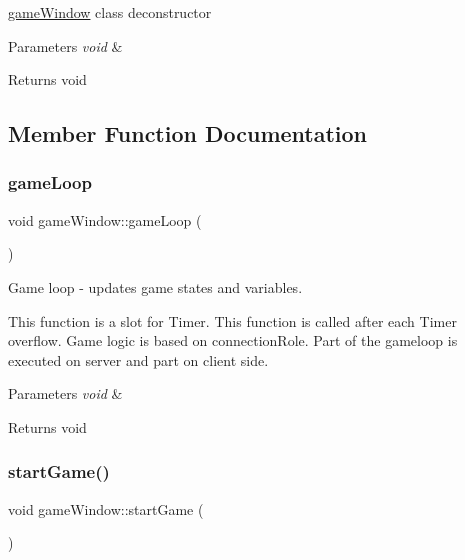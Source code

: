 \mbox{\hyperlink{classgame_window}{game\+Window}} class deconstructor 


\begin{DoxyParams}{Parameters}
{\em void} & \\
\hline
\end{DoxyParams}
\begin{DoxyReturn}{Returns}
void 
\end{DoxyReturn}


\subsection{Member Function Documentation}
\mbox{\label{classgame_window_a2aeb402950ac1faa754288a9e7464563}} 
\subsubsection{\texorpdfstring{game\+Loop}{gameLoop}}
{\footnotesize\ttfamily void game\+Window\+::game\+Loop (\begin{DoxyParamCaption}\item[{void}]{ }\end{DoxyParamCaption})\hspace{0.3cm}{\ttfamily [slot]}}



Game loop -\/ updates game states and variables. 

This function is a slot for Timer. This function is called after each Timer overflow. Game logic is based on connection\+Role. Part of the gameloop is executed on server and part on client side. 
\begin{DoxyParams}{Parameters}
{\em void} & \\
\hline
\end{DoxyParams}
\begin{DoxyReturn}{Returns}
void 
\end{DoxyReturn}
\mbox{\label{classgame_window_a790233fd0316f05a1fd35738d383349b}} 
\subsubsection{\texorpdfstring{start\+Game()}{startGame()}}
{\footnotesize\ttfamily void game\+Window\+::start\+Game (\begin{DoxyParamCaption}\item[{void}]{ }\end{DoxyParamCaption})}



